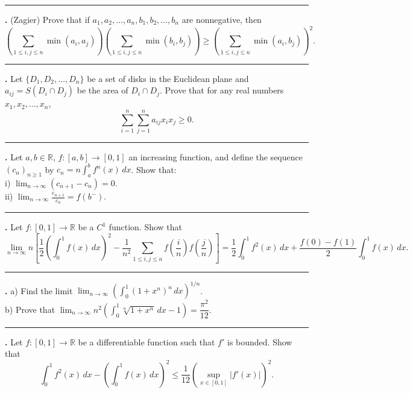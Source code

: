 \documentclass[11pt]{article}
\newcounter{probnum}
\newenvironment{problembox}{\par\noindent\rule{\linewidth}{0.5pt}\vspace{5pt}\par}{\vspace{2pt}}
\begin{document}
\begin{problembox}
\textbf{\theprobnum.} (Zagier) Prove that if $a_1, a_2, \ldots, a_n, b_1, b_2, \ldots, b_n$ are nonnegative, then
\[
\left(\sum_{1 \le i,j \le n} \min(a_i,a_j)\right) \left(\sum_{1 \le i,j \le n} \min(b_i,b_j)\right) \ge \left(\sum_{1 \le i,j \le n} \min(a_i,b_j)\right)^2.
\]
\end{problembox}

\begin{problembox}
\textbf{\theprobnum.} Let $\{D_1, D_2, \ldots, D_n\}$ be a set of disks in the Euclidean plane and $a_{ij} = S(D_i \cap D_j)$ be the area of $D_i \cap D_j$. Prove that for any real numbers $x_1, x_2, \ldots, x_n$,
\[
\sum_{i=1}^{n} \sum_{j=1}^{n} a_{ij} x_i x_j \ge 0.
\]
\end{problembox}

\begin{problembox}
\textbf{\theprobnum.} Let $a, b \in \mathbb{R}$, $f : [a,b] \to [0,1]$ an increasing function, and define the sequence $(c_n)_{n \ge 1}$ by $c_n = n \displaystyle\int_a^b f^n(x)\,dx$. Show that:\\
i) $\displaystyle\lim_{n \to \infty} (c_{n+1}-c_n) = 0$.\\
ii) $\displaystyle\lim_{n \to \infty} \frac{c_{n+1}}{c_n} = f(b^-)$.
\end{problembox}

\begin{problembox}
\textbf{\theprobnum.} Let $f : [0,1] \to \mathbb{R}$ be a $C^1$ function. Show that
\[
\lim_{n \to \infty} n \left[\frac{1}{2}\left(\int_0^1 f(x)\,dx\right)^2 - \frac{1}{n^2} \sum_{1 \le i,j \le n} f\!\left(\frac{i}{n}\right) f\!\left(\frac{j}{n}\right)\right] = \frac{1}{2}\int_0^1 f^2(x)\,dx + \frac{f(0)-f(1)}{2}\int_0^1 f(x)\,dx.
\]
\end{problembox}

\begin{problembox}
\textbf{\theprobnum.} a) Find the limit $\displaystyle\lim_{n \to \infty} \left(\int_0^1 (1+x^n)^n\,dx\right)^{1/n}$.\\
b) Prove that $\displaystyle\lim_{n \to \infty} n^2 \left(\int_0^1 \sqrt[n]{1+x^n}\,dx - 1\right) = \dfrac{\pi^2}{12}$.
\end{problembox}

\begin{problembox}
\textbf{\theprobnum.} Let $f : [0,1] \to \mathbb{R}$ be a differentiable function such that $f'$ is bounded. Show that
\[
\int_0^1 f^2(x)\,dx - \left(\int_0^1 f(x)\,dx\right)^2 \le \frac{1}{12} \left(\sup_{x \in [0,1]} |f'(x)|\right)^2.
\]
\end{problembox}
\end{document}
